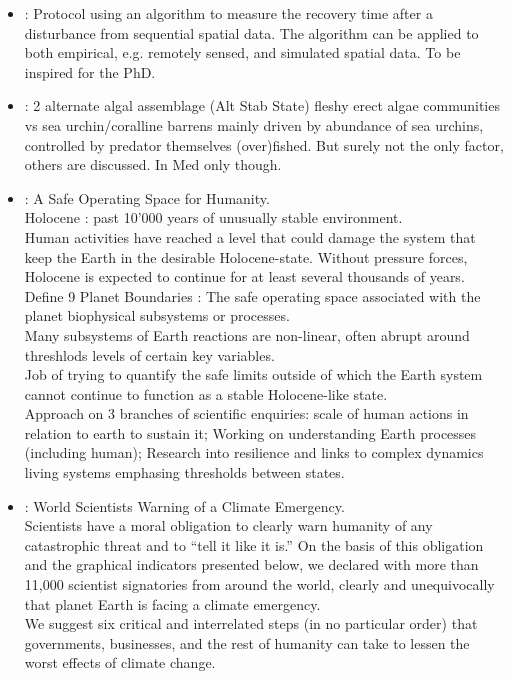 \documentclass[]{report}
\begin{document}
\begin{itemize}
		\item \cite{van2017timing} : Protocol using an algorithm to measure the recovery time after a disturbance from sequential spatial data. The algorithm can be applied to both empirical, e.g. remotely sensed, and simulated spatial data. To be inspired for the PhD.
		\item \cite{sala1998fishing} : 2 alternate algal assemblage (Alt Stab State) fleshy erect algae communities vs sea urchin/coralline barrens mainly driven by abundance of sea urchins, controlled by predator themselves (over)fished. But surely not the only factor, others are discussed. In Med only though.
		\item \cite{rockstrom2009safe} : A Safe Operating Space for Humanity.
		\\Holocene : past 10'000 years of unusually stable environment.
		\\Human activities have reached a level that could damage the system that keep the Earth in the desirable Holocene-state. Without pressure forces, Holocene is expected to continue for at least several thousands of years.
		\\Define 9 Planet Boundaries : The safe operating space associated with the planet biophysical subsystems or processes.
		\\ Many subsystems of Earth reactions are non-linear, often abrupt around threshlods levels of certain key variables.
		\\Job of trying to quantify the safe limits outside of which the Earth system cannot continue to function as a stable Holocene-like state.
		\\Approach on 3 branches of scientific enquiries: scale of human actions in relation to earth to sustain it; Working on understanding Earth processes (including human); Research into resilience and links to complex dynamics living systems emphasing thresholds between states.
		\item \cite{ripple2019world} : World Scientists Warning of a Climate Emergency.
		\\ Scientists have a moral obligation to clearly warn humanity of any catastrophic threat and to “tell it like it is.” On the basis of this obligation and the graphical indicators presented below, we declared with more than 11,000 scientist signatories from around the world, clearly and unequivocally that planet Earth is facing a climate emergency.
		\\ We suggest six critical and interrelated steps (in no particular order) that governments, businesses, and the rest of humanity can take to lessen the worst effects of climate change.

\end{itemize}
\end{document}
